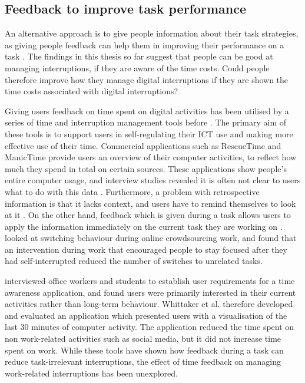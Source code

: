 \subsection{Feedback to improve task performance}
An alternative approach is to give people information about their task strategies, as giving people feedback can help them in improving their performance on a task \citep{Maior2018, Farmer2017}. The findings in this thesis so far suggest that people can be good at managing interruptions, if they are aware of the time costs. Could people therefore improve how they manage digital interruptions if they are shown the time costs associated with digital interruptions? 

Giving users feedback on time spent on digital activities has been utilised by a series of time and interruption management tools before \citep{Collins2014, Lyngs2018, Whittaker2016}. The primary aim of these tools is to support users in self-regulating their ICT use and making more effective use of their time. Commercial applications such as RescueTime and ManicTime provide users an overview of their computer activities, to reflect how much they spend in total on certain sources. These applications show people’s entire computer usage, and interview studies revealed it is often not clear to users what to do with this data \citep{Collins2014}. Furthermore, a problem with retrospective information is that it lacks context, and users have to remind themselves to look at it \citep{Whittaker2016}. On the other hand, feedback which is given during a task allows users to apply the information immediately on the current task they are working on \citep{Gould2016a, Maior2018}. \citet{Gould2016a} looked at switching behaviour during online crowdsourcing work, and found that an intervention during work that encouraged people to stay focused after they had self-interrupted reduced the number of switches to unrelated tasks.

\citet{Whittaker2016} interviewed office workers and students to establish user requirements for a time awareness application, and found users were primarily interested in their current activities rather than long-term behaviour. Whittaker et al. therefore developed and evaluated an application which presented users with a visualisation of the last 30 minutes of computer activity. The application reduced the time spent on non work-related activities such as social media, but it did not increase time spent on work. While these tools have shown how feedback during a task can reduce task-irrelevant interruptions, the effect of time feedback on managing work-related interruptions has been unexplored.

